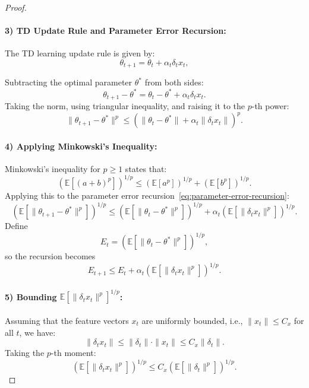 \begin{proof}
\paragraph{3) TD Update Rule and Parameter Error Recursion:}  
The TD learning update rule is given by:
\[
\theta_{t+1} = \theta_t + \alpha_t \delta_t x_t,
\]

Subtracting the optimal parameter \( \theta^* \) from both sides:
\[
\theta_{t+1} - \theta^* = \theta_t - \theta^* + \alpha_t \delta_t x_t.
\]
Taking the norm, using triangular inequality, and raising it to the \( p \)-th power:
\begin{equation}
\label{eq:parameter-error-recursion}
\|\theta_{t+1} - \theta^*\|^p \leq \left( \|\theta_t - \theta^*\| + \alpha_t \|\delta_t x_t\| \right)^p.
\end{equation}

\paragraph{4) Applying Minkowski’s Inequality:}  
Minkowski’s inequality for \( p \geq 1 \) states that:
\[
\left( \mathbb{E}\left[ \left( a + b \right)^p \right] \right)^{1/p} \leq \left( \mathbb{E}\left[ a^p \right] \right)^{1/p} + \left( \mathbb{E}\left[ b^p \right] \right)^{1/p}.
\]
Applying this to the parameter error recursion~\eqref{eq:parameter-error-recursion}:
\[
\left( \mathbb{E}\left[\|\theta_{t+1} - \theta^*\|^p\right] \right)^{1/p} \leq \left( \mathbb{E}\left[\|\theta_t - \theta^*\|^p\right] \right)^{1/p} + \alpha_t \left( \mathbb{E}\left[\|\delta_t x_t\|^p\right] \right)^{1/p}.
\]
Define
\[
E_t = \left( \mathbb{E}\left[\|\theta_t - \theta^*\|^p\right] \right)^{1/p},
\]
so the recursion becomes
\begin{equation}
\label{eq:minkowski-application}
E_{t+1} \leq E_t + \alpha_t \left( \mathbb{E}\left[\|\delta_t x_t\|^p\right] \right)^{1/p}.
\end{equation}

\paragraph{5) Bounding \( \mathbb{E}\left[\|\delta_t x_t\|^p\right]^{1/p} \):}  
Assuming that the feature vectors \( x_t \) are uniformly bounded, i.e., \( \|x_t\| \leq C_x \) for all \( t \), we have:
\[
\|\delta_t x_t\| \leq \|\delta_t\| \cdot \|x_t\| \leq C_x \|\delta_t\|.
\]
Taking the \( p \)-th moment:
\begin{equation}
\label{eq:deltax-bound}
\left( \mathbb{E}\left[\|\delta_t x_t\|^p\right] \right)^{1/p} \leq C_x \left( \mathbb{E}\left[\|\delta_t\|^p\right] \right)^{1/p}.
\end{equation}


\end{proof}
